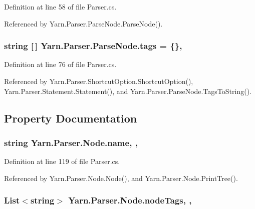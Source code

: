 Definition at line 58 of file Parser.\-cs.



Referenced by Yarn.\-Parser.\-Parse\-Node.\-Parse\-Node().

\hypertarget{a00142_a58b3a15788fd2d4127d73619dc6d04ae}{
\subsubsection[{tags}]{\setlength{\rightskip}{0pt plus 5cm}string \mbox{[}$\,$\mbox{]} Yarn.\-Parser.\-Parse\-Node.\-tags = \{\}\hspace{0.3cm}{\ttfamily [package]}, {\ttfamily [inherited]}}}\label{a00142_a58b3a15788fd2d4127d73619dc6d04ae}


Definition at line 76 of file Parser.\-cs.



Referenced by Yarn.\-Parser.\-Shortcut\-Option.\-Shortcut\-Option(), Yarn.\-Parser.\-Statement.\-Statement(), and Yarn.\-Parser.\-Parse\-Node.\-Tags\-To\-String().



\subsection{Property Documentation}
\hypertarget{a00132_a3cfa07840da3a7a92c820788e902aefb}{
\subsubsection[{name}]{\setlength{\rightskip}{0pt plus 5cm}string Yarn.\-Parser.\-Node.\-name\hspace{0.3cm}{\ttfamily [get]}, {\ttfamily [set]}, {\ttfamily [package]}}}\label{a00132_a3cfa07840da3a7a92c820788e902aefb}


Definition at line 119 of file Parser.\-cs.



Referenced by Yarn.\-Parser.\-Node.\-Node(), and Yarn.\-Parser.\-Node.\-Print\-Tree().

\hypertarget{a00132_a7b1e55929dd7c9b1b0349a70d1787f2a}{
\subsubsection[{node\-Tags}]{\setlength{\rightskip}{0pt plus 5cm}List$<$string$>$ Yarn.\-Parser.\-Node.\-node\-Tags\hspace{0.3cm}{\ttfamily [get]}, {\ttfamily [set]}, {\ttfamily [package]}}}\label{a00132_a7b1e55929dd7c9b1b0349a70d1787f2a}


